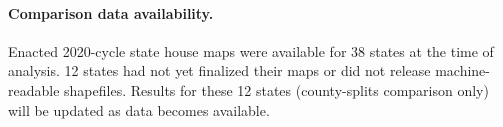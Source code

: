 \paragraph{Comparison data availability.}
Enacted 2020-cycle state house maps were available for 38 states at the time
of analysis. 12 states had not yet finalized their maps or did not release
machine-readable shapefiles. Results for these 12 states (county-splits
comparison only) will be updated as data becomes available.
